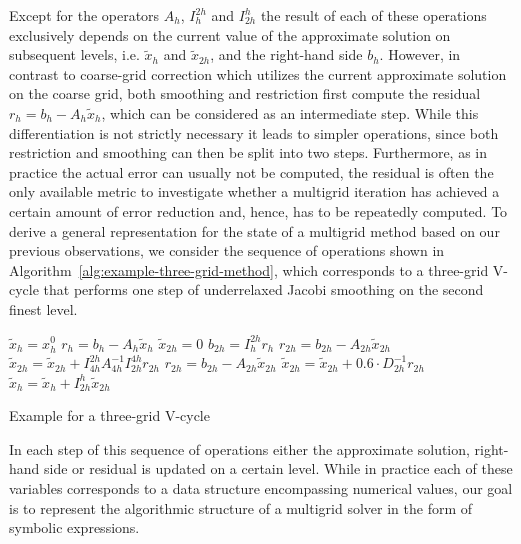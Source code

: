 Except for the operators $A_h$, $I_h^{2h}$ and $I_{2h}^h$ the result of each of these operations exclusively depends on the current value of the approximate solution on subsequent levels, i.e. $\tilde{x}_{h}$ and $\tilde{x}_{2h}$, and the right-hand side $b_h$.
However, in contrast to coarse-grid correction which utilizes the current approximate solution on the coarse grid, both smoothing and restriction first compute the residual $r_h = b_h - A_h \tilde{x}_h$, which can be considered as an intermediate step.
While this differentiation is not strictly necessary it leads to simpler operations, since both restriction and smoothing can then be split into two steps.
Furthermore, as in practice the actual error can usually not be computed, the residual is often the only available metric to investigate whether a multigrid iteration has achieved a certain amount of error reduction and, hence, has to be repeatedly computed.
To derive a general representation for the state of a multigrid method based on our previous observations, we consider the sequence of operations shown in Algorithm~\ref{alg:example-three-grid-method}, which corresponds to a three-grid V-cycle that performs one step of underrelaxed Jacobi smoothing on the second finest level.
\begin{algorithm}
	\begin{algorithmic}[1]
		\State $\tilde{x}_{h} = x_{h}^0$
		\State $r_{h} = b_{h} - A_h \tilde{x}_{h} $
		\State $ \tilde{x}_{2h} = 0$
		\State $ b_{2h} = I_{h}^{2h} r_{h}$
		\State $ r_{2h} = b_{2h} - A_{2h} \tilde{x}_{2h}$
		\State $ \tilde{x}_{2h} = \tilde{x}_{2h} + I_{4h}^{2h} A_{4h}^{-1} I_{2h}^{4h} r_{2h}$
		\State $ r_{2h} = b_{2h} - A_{2h} \tilde{x}_{2h}$
		\State $ \tilde{x}_{2h} = \tilde{x}_{2h} + 0.6 \cdot D_{2h}^{-1} r_{2h}$
		\State $\tilde{x}_{h} = \tilde{x}_{h}  + I_{2h}^h \tilde{x}_{2h}$
	\end{algorithmic}
\caption{Example for a three-grid V-cycle}
\label{alg:example-three-grid-method}
\end{algorithm}
In each step of this sequence of operations either the approximate solution, right-hand side or residual is updated on a certain level.
While in practice each of these variables corresponds to a data structure encompassing numerical values, our goal is to represent the algorithmic structure of a multigrid solver in the form of symbolic expressions.
